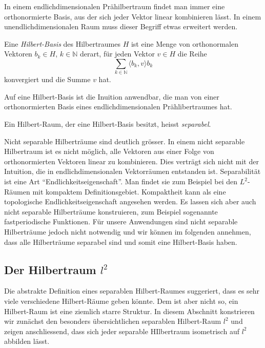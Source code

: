 In einem endlichdimensionalen Prähilbertraum findet man immer eine
orthonormierte Basis, aus der sich jeder Vektor linear kombinieren
lässt.
In einem unendlichdimensionalen Raum muss dieser Begriff etwas 
erweitert werden.

\begin{definition}
Eine {\em Hilbert-Basis} des Hilbertraumes $H$ ist eine Menge von orthonormalen
%
Vektoren $b_k\in H$, $k\in \mathbb{N}$ derart, für jeden Vektor $v\in H$
die Reihe 
\[
\sum_{k\in\mathbb{N}} \langle b_k,v\rangle b_k
\]
konvergiert und die Summe $v$ hat.
\end{definition}

Auf eine Hilbert-Basis ist die Inuition anwendbar, die man von 
einer orthonormierten Basis eines endlichdimensionalen Prählibertraumes
hat.

\begin{definition}
%
Ein Hilbert-Raum, der eine Hilbert-Basis besitzt, heisst {\em separabel}.
\end{definition}

Nicht separable Hilberträume sind deutlich grösser.
In einem nicht separable Hilbertraum ist es nicht möglich, alle Vektoren
aus einer Folge von orthonormierten Vektoren linear zu kombinieren.
Dies verträgt sich nicht mit der Intuition, die in endlichdimensionalen
Vektorräumen entstanden ist.
Separabilität ist eine Art ``Endlichkeitseigenschaft''.
Man findet sie zum Beispiel bei den $L^2$-Räumen mit kompaktem
Definitionsgebiet.
Kompaktheit kann als eine topologische
Endlichkeitseigenschaft angesehen werden.
Es lassen sich aber auch nicht separable Hilberträume konstruieren,
zum Beispiel sogenannte fastperiodische Funktionen.
%
Für unsere Anwendungen sind nicht separable Hilberträume jedoch nicht
notwendig und wir können im folgenden annehmen, dass alle Hilberträume
separabel sind und somit eine Hilbert-Basis haben.

%
%
\subsection{Der Hilbertraum $l^2$}
Die abstrakte Definition eines separablen Hilbert-Raumes suggeriert,
dass es sehr viele verschiedene Hilbert-Räume geben könnte.
Dem ist aber nicht so, ein Hilbert-Raum ist eine ziemlich starre Struktur.
In diesem Abschnitt konstrieren wir zunächst den besonders übersichtlichen
separablen Hilbert-Raum $l^2$ und zeigen anschliessend, dass sich jeder
separable HIlbertraum isometrisch auf $l^2$ abbilden lässt.

